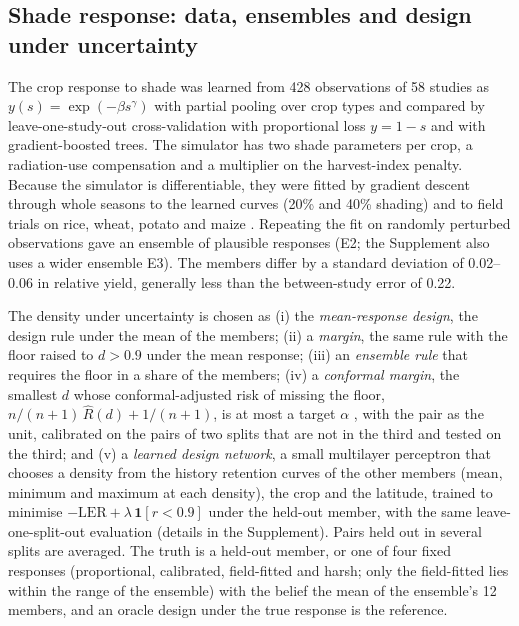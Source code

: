 \subsection{Shade response: data, ensembles and design under uncertainty}\label{sec:m-uncertainty}
The crop response to shade was learned from 428 observations of 58 studies \citep{laub2022} as $y(s)=\exp(-\beta s^{\gamma})$ with partial pooling over crop types and compared by leave-one-study-out cross-validation with proportional loss $y=1-s$ and with gradient-boosted trees. The simulator has two shade parameters per crop, a radiation-use compensation and a multiplier on the harvest-index penalty. Because the simulator is differentiable, they were fitted by gradient descent through whole seasons to the learned curves (20\% and 40\% shading) and to field trials on rice, wheat, potato and maize \citep{gonocruz2021,weselek2021,ramosfuentes2023}. Repeating the fit on randomly perturbed observations gave an ensemble of plausible responses (E2; the Supplement also uses a wider ensemble E3). The members differ by a standard deviation of 0.02--0.06 in relative yield, generally less than the between-study error of 0.22.

The density under uncertainty is chosen as (i) the \emph{mean-response design}, the design rule under the mean of the members; (ii) a \emph{margin}, the same rule with the floor raised to $d>0.9$ under the mean response; (iii) an \emph{ensemble rule} that requires the floor in a share of the members; (iv) a \emph{conformal margin}, the smallest $d$ whose conformal-adjusted risk of missing the floor, $n/(n+1)\,\hat R(d)+1/(n+1)$, is at most a target $\alpha$ \citep{angelopoulos2024}, with the pair as the unit, calibrated on the pairs of two splits that are not in the third and tested on the third; and (v) a \emph{learned design network}, a small multilayer perceptron that chooses a density from the history retention curves of the other members (mean, minimum and maximum at each density), the crop and the latitude, trained to minimise $-\mathrm{LER}+\lambda\,\mathbf{1}[r<0.9]$ under the held-out member, with the same leave-one-split-out evaluation (details in the Supplement). Pairs held out in several splits are averaged. The truth is a held-out member, or one of four fixed responses (proportional, calibrated, field-fitted and harsh; only the field-fitted lies within the range of the ensemble) with the belief the mean of the ensemble's 12 members, and an oracle design under the true response is the reference.

